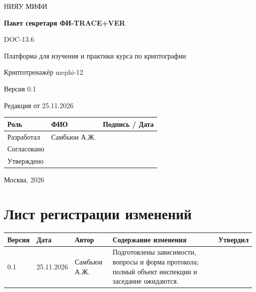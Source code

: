 \documentclass[12pt,a4paper]{article}
\begin{document}
\hypersetup{pageanchor=false}
\begin{titlepage}
  \thispagestyle{empty}
  \centering
  {\large НИЯУ МИФИ\par}
  \vspace*{3.5cm}
  {\LARGE\bfseries Пакет секретаря ФИ-TRACE+VER\par}
  \vspace{0.5cm}
  {\large DOC-13.6\par}
  \vspace{0.6cm}
  {\large Платформа для изучения и практики курса по криптографии\par}
  {\large Криптотренажёр mephi-12\par}
  \vspace{0.7cm}
  {\large Версия 0.1\par}
  {\large Редакция от 25.11.2026\par}
  \vspace{1cm}
  \begin{tabularx}{\textwidth}{@{}p{3.4cm}Xp{4cm}@{}}
    \toprule
    Роль & ФИО & Подпись / Дата \\
    \midrule
    Разработал & Самбьюи А.Ж. & \\
    \addlinespace[6pt]
    Согласовано & & \\
    \addlinespace[6pt]
    Утверждено & & \\
    \bottomrule
  \end{tabularx}
  \vfill
  {\large Москва, 2026\par}
\end{titlepage}
\hypersetup{pageanchor=true}

\section*{Лист регистрации изменений}
\begingroup\small\singlespacing
\noindent
\begin{tabularx}{\textwidth}{@{}p{1.2cm}p{2cm}p{2.5cm}Xp{1.8cm}@{}}
\toprule
Версия & Дата & Автор & Содержание изменения & Утвердил \\
\midrule
0.1 & 25.11.2026 & Самбьюи А.Ж. & Подготовлены зависимости, вопросы и форма протокола; полный объект инспекции и заседание ожидаются. & \\
\bottomrule
\end{tabularx}
\endgroup
\clearpage
\begingroup\small\singlespacing
\tableofcontents
\endgroup
\clearpage

\hypertarget{doc-136-пакет-секретаря-фи-tracever}{}
\end{document}
